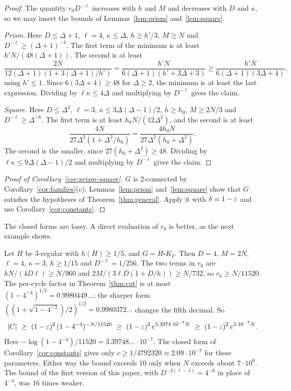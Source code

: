 \begin{proof}
The quantity $r_0D^{-\ell}$ increases with $h$ and $M$ and decreases with $D$ and $\kappa$, so we may insert the bounds of Lemmas~\ref{lem:prism} and~\ref{lem:square}.

\emph{Prism.} Here $D\le\Delta+1$, $\ell=4$, $\kappa\le\Delta$, $h\ge h'/3$, $M\ge N$ and $D^{-\ell}\ge(\Delta+1)^{-4}$. The first term of the minimum is at least $h'N/(48(\Delta+1))$. The second is at least
\[
  \frac{2N}{12(\Delta+1)(1+3(\Delta+1)/h')}=\frac{h'N}{6(\Delta+1)(h'+3\Delta+3)}\ge\frac{h'N}{6(\Delta+1)(3\Delta+4)},
\]
using $h'\le1$. Since $6(3\Delta+4)\ge48$ for $\Delta\ge2$, the minimum is at least the last expression. Dividing by $\ell\kappa\le4\Delta$ and multiplying by $D^{-\ell}$ gives the claim.

\emph{Square.} Here $D\le\Delta^2$, $\ell=3$, $\kappa\le3\Delta(\Delta-1)/2$, $h\ge h_0$, $M\ge2N/3$ and $D^{-\ell}\ge\Delta^{-6}$. The first term is at least $h_0N/(12\Delta^2)$, and the second is at least
\[
  \frac{4N}{27\Delta^2(1+\Delta^2/h_0)}=\frac{4h_0N}{27\Delta^2(h_0+\Delta^2)} .
\]
The second is the smaller, since $27(h_0+\Delta^2)\ge48$. Dividing by $\ell\kappa\le9\Delta(\Delta-1)/2$ and multiplying by $D^{-\ell}$ gives the claim.
\end{proof}

\begin{proof}[Proof of Corollary~\ref{cor:prism-square}]
$G$ is 2-connected by Corollary~\ref{cor:families}(c). Lemmas~\ref{lem:prism} and~\ref{lem:square} show that $G$ satisfies the hypotheses of Theorem~\ref{thm:general}. Apply it with $\delta=1-\varepsilon$ and use Corollary~\ref{cor:constants}.
\end{proof}

The closed forms are lossy. A direct evaluation of $r_0$ is better, as the next example shows.

\begin{example}\label{ex:cubic}
Let $H$ be $3$-regular with $h(H)\ge1/5$, and $G=H\square K_2$. Then $D=4$, $M=2N$, $\ell=4$, $\kappa=3$, $h\ge1/15$ and $D^{-\ell}=1/256$. The two terms in $r_0$ are $hN/(4D\ell)\ge N/960$ and $2M/(3\ell D(1+D/h))\ge N/732$, so $r_0\ge N/11520$. The per-cycle factor in Theorem~\ref{thm:cut} is at most $(1-4^{-4})^{1/2}=0.9980449\ldots$; the sharper form $((1+\sqrt{1-4^{-3}})/2)^{1/2}=0.9980372\ldots$ changes the fifth decimal. So
\[
  \abs C\ \ge\ (1-\eps)^2\,(1-4^{-4})^{-N/11520}\ \ge\ (1-\eps)^2\,e^{3.3974\cdot10^{-7}N}\ \ge\ (1-\eps)^2\,e^{3\cdot10^{-7}N}.
\]
Here $-\log(1-4^{-4})/11520=3.39748\ldots\cdot10^{-7}$. The closed form of Corollary~\ref{cor:constants} gives only $c\ge1/4792320\approx2.09\cdot10^{-7}$ for these parameters. Either way the bound exceeds $10$ only when $N$ exceeds about $7\cdot10^6$. The bound of the first version of this paper, with $D^{-2(\ell-1)}=4^{-6}$ in place of $4^{-4}$, was $16$ times weaker.
\end{example}

